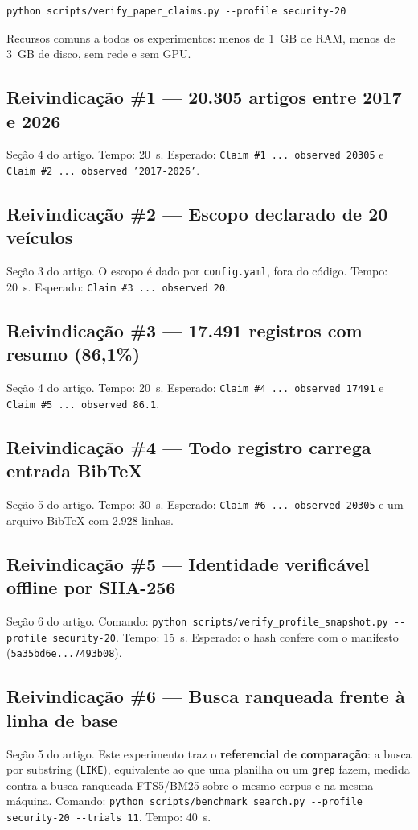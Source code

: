 \documentclass[12pt]{article}
\begin{document}
\begin{verbatim}
python scripts/verify_paper_claims.py --profile security-20
\end{verbatim}

\noindent Recursos comuns a todos os experimentos: menos de 1~GB de RAM, menos
de 3~GB de disco, sem rede e sem GPU.

\subsection{Reivindicação \#1 --- 20.305 artigos entre 2017 e 2026}
Seção 4 do artigo. Tempo: 20~s. Esperado: \texttt{Claim \#1 ... observed 20305} e
\texttt{Claim \#2 ... observed '2017-2026'}.

\subsection{Reivindicação \#2 --- Escopo declarado de 20 veículos}
Seção 3 do artigo. O escopo é dado por \texttt{config.yaml}, fora do código.
Tempo: 20~s. Esperado: \texttt{Claim \#3 ... observed 20}.

\subsection{Reivindicação \#3 --- 17.491 registros com resumo (86,1\%)}
Seção 4 do artigo. Tempo: 20~s. Esperado: \texttt{Claim \#4 ... observed 17491} e
\texttt{Claim \#5 ... observed 86.1}.

\subsection{Reivindicação \#4 --- Todo registro carrega entrada BibTeX}
Seção 5 do artigo. Tempo: 30~s. Esperado: \texttt{Claim \#6 ... observed 20305} e
um arquivo BibTeX com 2.928 linhas.

\subsection{Reivindicação \#5 --- Identidade verificável offline por SHA-256}
Seção 6 do artigo. Comando:
\texttt{python scripts/verify\_profile\_snapshot.py -{}-profile security-20}.
Tempo: 15~s. Esperado: o hash confere com o manifesto
(\texttt{5a35bd6e...7493b08}).

\subsection{Reivindicação \#6 --- Busca ranqueada frente à linha de base}
Seção 5 do artigo. Este experimento traz o \textbf{referencial de comparação}: a
busca por substring (\texttt{LIKE}), equivalente ao que uma planilha ou um
\texttt{grep} fazem, medida contra a busca ranqueada FTS5/BM25 sobre o mesmo
corpus e na mesma máquina. Comando:
\texttt{python scripts/benchmark\_search.py -{}-profile security-20 -{}-trials 11}.
Tempo: 40~s.
\end{document}
